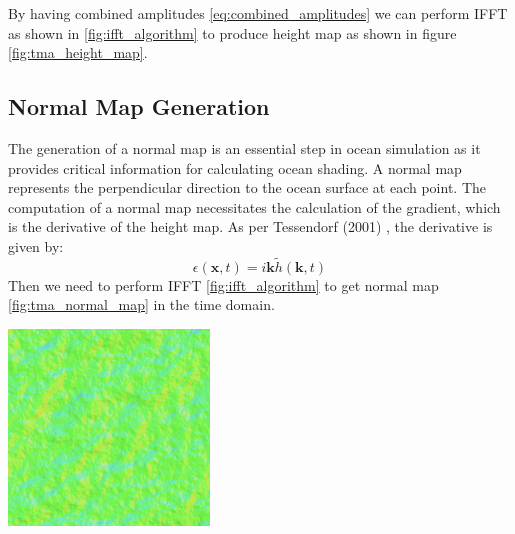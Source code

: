 By having combined amplitudes \ref{eq:combined_amplitudes} we can perform IFFT as shown in \ref{fig:ifft_algorithm} to produce height map as shown in figure \ref{fig:tma_height_map}.\\

\subsection{Normal Map Generation}

The generation of a normal map is an essential step in ocean simulation as it provides critical information for calculating ocean shading. A normal map represents the perpendicular direction to the ocean surface at each point.
The computation of a normal map necessitates the calculation of the gradient, which is the derivative of the height map. As per Tessendorf (2001) \cite{tessendorf2001}, the derivative is given by:
\begin{equation}
    \epsilon(\textbf{x}, t) = i\textbf{k} \tilde{h}(\textbf{k}, t)
\end{equation}
Then we need to perform IFFT \ref{fig:ifft_algorithm} to get normal map \ref{fig:tma_normal_map} in the time domain.

\begin{minipage}{1\textwidth}
    \centering
    \includegraphics[width=0.40\textwidth]{"images/tma_normal.png"}
    \label{fig:tma_normal_map}
\end{minipage}

